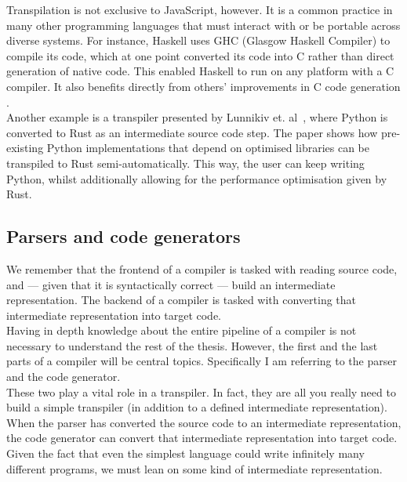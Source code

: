 
Transpilation is not exclusive to JavaScript, however. It is a common practice in many other programming languages that must interact with or be portable across diverse systems. For instance, Haskell uses GHC (Glasgow Haskell Compiler) to compile its code, which at one point converted its code into C rather than direct generation of native code. This enabled Haskell to run on any platform with a C compiler. It also benefits directly from others' improvements in C code generation \cite{HaskellToC}. \hfill \\

Another example is a transpiler presented by Lunnikiv et. al~\cite{DBLP:conf/samos/LunnikiviJ020}, where Python is converted to Rust as an intermediate source code step. The paper shows how pre-existing Python implementations that depend on optimised libraries can be transpiled to Rust semi-automatically. This way, the user can keep writing Python, whilst additionally allowing for the performance optimisation given by Rust.

\subsection{Parsers and code generators}

We remember that the frontend of a compiler is tasked with reading source code, and --- given that it is syntactically correct --- build an intermediate representation. The backend of a compiler is tasked with converting that intermediate representation into target code. \hfill \\

Having in depth knowledge about the entire pipeline of a compiler is not necessary to understand the rest of the thesis. However, the first and the last parts of a compiler will be central topics. Specifically I am referring to the parser and the code generator. \hfill \\

These two play a vital role in a transpiler. In fact, they are all you really need to build a simple transpiler (in addition to a defined intermediate representation). When the parser has converted the source code to an intermediate representation, the code generator can convert that intermediate representation into target code. Given the fact that even the simplest language could write infinitely many different programs, we must lean on some kind of intermediate representation. \hfill \\

